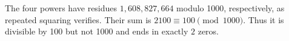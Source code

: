The four powers have residues $1,608,827,664$ modulo 1000, respectively, as repeated squaring verifies. Their sum is $2100\equiv100\pmod{1000}$. Thus it is divisible by 100 but not 1000 and ends in exactly $\boxed2$ zeros.
